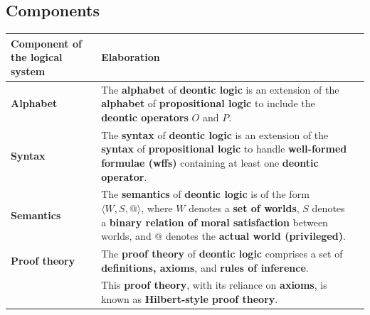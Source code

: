 \documentclass[11pt]{article}
\begin{document}
\subsection{Components}
\label{sec:orgc21ab78}
\begin{center}
\begin{tabularx}{\textwidth}{|X|X|X|}
\hline
Component of the logical system & Elaboration\\
\hline
\textbf{Alphabet} & The \textbf{alphabet} of \textbf{deontic logic} is an extension of the \textbf{alphabet} of \textbf{propositional logic} to include the \textbf{deontic operators} \(O\) and \(P\).\\
\hline
\textbf{Syntax} & The \textbf{syntax} of \textbf{deontic logic} is an extension of the \textbf{syntax} of \textbf{propositional logic} to handle \textbf{well-formed formulae (wffs)} containing at least one \textbf{deontic operator}.\\
\hline
\textbf{Semantics} & The \textbf{semantics} of \textbf{deontic logic} is of the form \(\langle W, S, @ \rangle\), where \(W\) denotes a \textbf{set of worlds}, \(S\) denotes a \textbf{binary relation of moral satisfaction} between worlds, and \(@\) denotes the \textbf{actual world (privileged)}.\\
\hline
\textbf{Proof theory} & The \textbf{proof theory} of \textbf{deontic logic} comprises a set of \textbf{definitions, axioms}, and \textbf{rules of inference}.\\
 & This \textbf{proof theory}, with its reliance on \textbf{axioms}, is known as \textbf{Hilbert-style proof theory}.\\
\hline
\end{tabularx}
\end{center}
\end{document}
